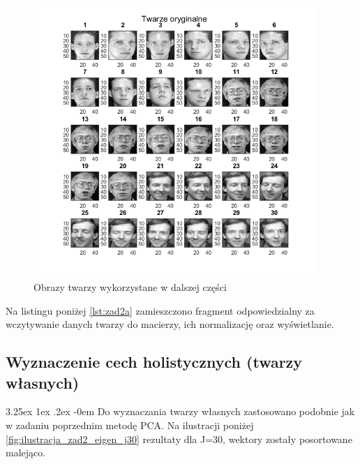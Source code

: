 \documentclass[11pt, a4paper]{article}
\makeatletter
\newcommand{\fbi}{\leavevmode{\parindent=1em\indent}}
\renewcommand\paragraph{\@startsection{paragraph}{5}{\z@}
  {3.25ex \@plus1ex \@minus.2ex}
  {-0em}
  {\normalfont\normalsize\bfseries}}
\makeatother
\begin{document}
\begin{figure}[H]
	\centering
	\includegraphics[width=0.95\textwidth]{./assets/ilustracja_zad2_dane.png}
	\caption{Obrazy twarzy wykorzystane w dalszej części}
	\label{fig:ilustracja_zad2_dane}
\end{figure}

\newpage

\fbi
Na listingu poniżej \ref{lst:zad2a} zamieszczono fragment odpowiedzialny za wczytywanie danych twarzy do macierzy, ich normalizację oraz wyświetlanie.



\subsection{Wyznaczenie cech holistycznych (twarzy własnych)}
\paragraph{}
Do wyznaczania twarzy własnych zastosowano podobnie jak w zadaniu poprzednim metodę PCA. Na ilustracji poniżej \ref{fig:ilustracja_zad2_eigen_j30} rezultaty dla J=30, wektory zostały posortowane malejąco.
\end{document}
